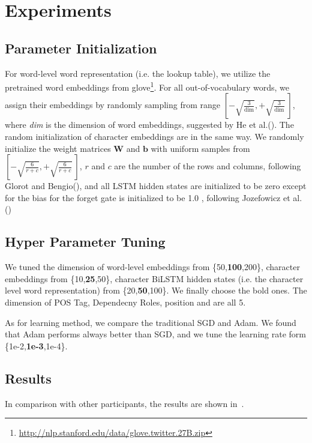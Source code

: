 \section{Experiments}
\label{sec:eval}

\subsection{Parameter Initialization}
For word-level word representation (i.e. the lookup table), 
we utilize the pretrained word embeddings from glove\footnote{\url{http://nlp.stanford.edu/data/glove.twitter.27B.zip}}.
For all out-of-vocabulary words, we assign their embeddings by randomly sampling from range $\left[-\sqrt{\frac{3}{\text{dim}}}, +\sqrt{\frac{3}{\text{dim}}}~\right]$, where \textit{dim} is the dimension of word embeddings, suggested by He et al.(\citeyear{DBLP:conf/iccv/HeZRS15}). The random initialization of character embeddings are in the same way.
We randomly initialize the weight matrices $\mathbf{W}$ and $\mathbf{b}$ with uniform samples from 
$\left[-\sqrt{\frac{6}{r+c}}, +\sqrt{\frac{6}{r+c}}~\right]$, 
$r$ and $c$ are the number of the rows and columns, following Glorot and Bengio(\citeyear{DBLP:journals/jmlr/GlorotB10}), and all LSTM hidden states are initialized to be zero except for the bias for the forget gate is initialized to be 1.0 , following Jozefowicz et al.(\citeyear{DBLP:conf/icml/JozefowiczZS15}) 


\subsection{Hyper Parameter Tuning}
We tuned the dimension of word-level embeddings from \{50,\textbf{100},200\}, character embeddings from \{10,\textbf{25},50\}, character BiLSTM hidden states (i.e. the character level word representation)  from  \{20,\textbf{50},100\}. 
We finally choose the bold ones.
The dimension of POS Tag, Dependecny Roles, position and  are all 5.

As for learning method, we compare the traditional SGD and Adam.
We found that Adam performs always better than SGD, and we tune the learning rate form \{1e-2,\textbf{1e-3},1e-4\}.

\subsection{Results} 
In comparison with other participants, the results are shown in~.

